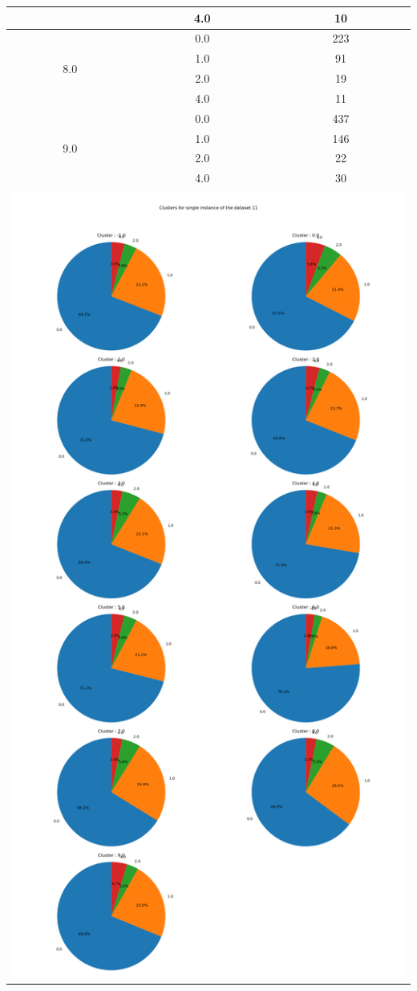 \begin{longtable}{|c|c|c|c|c|}
& \multicolumn{2}{c|}{4.0} & \multicolumn{2}{c|}{10} \\
\hline
\multirow{4}{*}{8.0} & \multicolumn{2}{c|}{0.0} & \multicolumn{2}{c|}{223} \\
& \multicolumn{2}{c|}{1.0} & \multicolumn{2}{c|}{91} \\
& \multicolumn{2}{c|}{2.0} & \multicolumn{2}{c|}{19} \\
& \multicolumn{2}{c|}{4.0} & \multicolumn{2}{c|}{11} \\
\hline
\multirow{4}{*}{9.0} & \multicolumn{2}{c|}{0.0} & \multicolumn{2}{c|}{437} \\
& \multicolumn{2}{c|}{1.0} & \multicolumn{2}{c|}{146} \\
& \multicolumn{2}{c|}{2.0} & \multicolumn{2}{c|}{22} \\
& \multicolumn{2}{c|}{4.0} & \multicolumn{2}{c|}{30} \\
\hline
\multicolumn{5}{|c|}{\includegraphics[width=0.8\linewidth]{img/annexes/11/clustering_pie_charts/single instance.png}} \\
\end{longtable}


